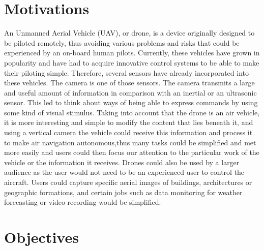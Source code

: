 
\section{Motivations}


An Unmanned Aerial Vehicle (UAV), or drone, is a device originally designed to be piloted remotely, thus avoiding various problems and risks that could be experienced by an on-board human pilots. Currently, these vehicles have grown in popularity and have had to acquire innovative control systems to be able to make their piloting simple. Therefore, several sensors  have already incorporated into these vehicles. The camera is one of those sensors. The camera transmits a large and useful amount of information in comparison with an inertial or an ultrasonic sensor. This led to think about ways of being able to express commands by using some kind of visual stimulus. Taking into account that the drone is an air vehicle, it is more interesting and simple to modify the content that lies beneath it, and using a vertical camera the vehicle could receive this information and process it to make air navigation autonomous,thus many tasks could be simplified and met more easily and users could then focus our attention to the particular work of the vehicle or the information it receives. Drones could also be used by a larger audience as the user would not need to be an experienced user to control the aircraft. Users could capture specific aerial images of buildings, architectures or geographic formations, and certain jobs such as data monitoring for weather forecasting or video recording would be simplified.


\section{Objectives}

